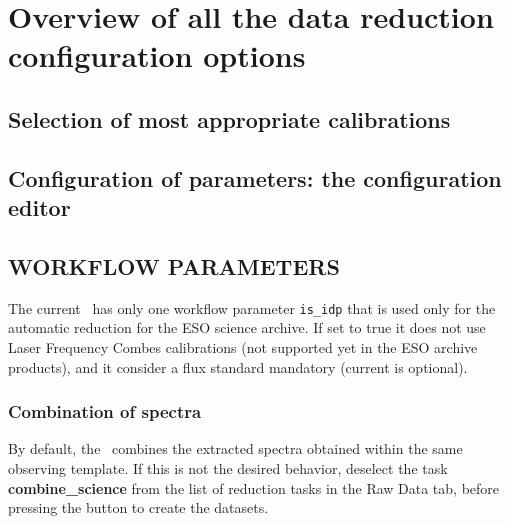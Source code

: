 \section{Overview of all the data reduction configuration options}
\label{sec:configuretion_overview}

\subsection{Selection of most appropriate calibrations}



\subsection{Configuration of parameters: the configuration editor}
\label{sec:configuration_editor}


\subsection{WORKFLOW PARAMETERS}

The current \wkfname\ has only one workflow parameter {\tt is\_idp}
that is used only for the automatic reduction for the ESO science
archive.  If set to true it does not use Laser Frequency Combes
calibrations (not supported yet in the ESO archive products), and it
consider a flux standard mandatory (current is optional).


\subsubsection{Combination of spectra}

By default, the \wkfname\ combines the extracted spectra obtained
within the same observing template. If this is not the desired
behavior, deselect the task {\bf combine\_science} from the list of
reduction tasks in the Raw Data tab, before pressing the button to
create the datasets.

